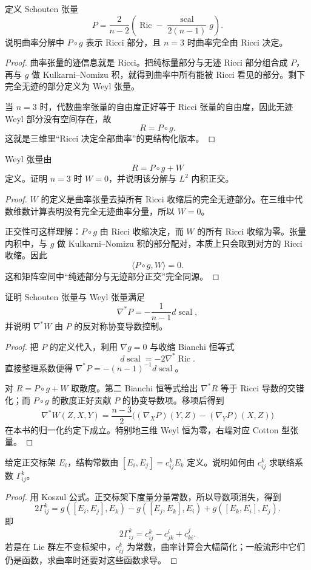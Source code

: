 \documentclass[11pt,a4paper,openany]{ctexbook}
\numberwithin{equation}{chapter}
\begin{document}
\begin{problem}
定义 Schouten 张量
\[
P=\frac{2}{n-2}\left(\operatorname{Ric}-\frac{\operatorname{scal}}{2(n-1)}g\right).
\]
说明曲率分解中 \(P\circ g\) 表示 Ricci 部分，且 \(n=3\) 时曲率完全由 Ricci 决定。
\end{problem}
\begin{proof}
曲率张量的迹信息就是 Ricci。把纯标量部分与无迹 Ricci 部分组合成 \(P\)，再与 \(g\) 做 Kulkarni--Nomizu 积，就得到曲率中所有能被 Ricci 看见的部分。剩下完全无迹的部分定义为 Weyl 张量。

当 \(n=3\) 时，代数曲率张量的自由度正好等于 Ricci 张量的自由度，因此无迹 Weyl 部分没有空间存在，故
\[
R=P\circ g.
\]
这就是三维里“Ricci 决定全部曲率”的更结构化版本。
\end{proof}

\begin{problem}
Weyl 张量由
\[
R=P\circ g+W
\]
定义。证明 \(n=3\) 时 \(W=0\)，并说明该分解与 \(L^2\) 内积正交。
\end{problem}
\begin{proof}
\(W\) 的定义是曲率张量去掉所有 Ricci 收缩后的完全无迹部分。在三维中代数维数计算表明没有完全无迹曲率分量，所以 \(W=0\)。

正交性可这样理解：\(P\circ g\) 由 Ricci 收缩决定，而 \(W\) 的所有 Ricci 收缩为零。张量内积中，与 \(g\) 做 Kulkarni--Nomizu 积的部分配对，本质上只会取到对方的 Ricci 收缩。因此
\[
\langle P\circ g,W\rangle=0.
\]
这和矩阵空间中“纯迹部分与无迹部分正交”完全同源。
\end{proof}

\begin{problem}
证明 Schouten 张量与 Weyl 张量满足
\[
\nabla^*P=-\frac1{n-1}d\operatorname{scal},
\]
并说明 \(\nabla^*W\) 由 \(P\) 的反对称协变导数控制。
\end{problem}
\begin{proof}
把 \(P\) 的定义代入，利用 \(\nabla g=0\) 与收缩 Bianchi 恒等式
\[
d\operatorname{scal}=-2\nabla^*\operatorname{Ric}.
\]
直接整理系数便得 \(\nabla^*P=-(n-1)^{-1}d\operatorname{scal}\)。

对 \(R=P\circ g+W\) 取散度。第二 Bianchi 恒等式给出 \(\nabla^*R\) 等于 Ricci 导数的交错化；而 \(P\circ g\) 的散度正好贡献 \(P\) 的协变导数项。移项后得到
\[
\nabla^*W(Z,X,Y)=\frac{n-3}{2}\bigl((\nabla_XP)(Y,Z)-(\nabla_YP)(X,Z)\bigr)
\]
在本书的归一化约定下成立。特别地三维 Weyl 恒为零，右端对应 Cotton 型张量。
\end{proof}

\begin{problem}
给定正交标架 \(E_i\)，结构常数由 \([E_i,E_j]=c^k_{ij}E_k\) 定义。说明如何由 \(c^k_{ij}\) 求联络系数 \(\Gamma^k_{ij}\)。
\end{problem}
\begin{proof}
用 Koszul 公式。正交标架下度量分量常数，所以导数项消失，得到
\[
2\Gamma^k_{ij}
=g([E_i,E_j],E_k)-g([E_j,E_k],E_i)+g([E_k,E_i],E_j).
\]
即
\[
2\Gamma^k_{ij}=c^k_{ij}-c^i_{jk}+c^j_{ki}.
\]
若是在 Lie 群左不变标架中，\(c^k_{ij}\) 为常数，曲率计算会大幅简化；一般流形中它们仍是函数，求曲率时还要对这些函数求导。
\end{proof}
\end{document}
